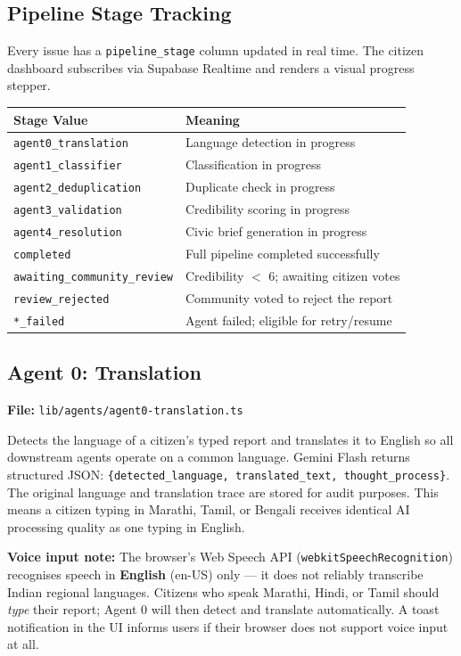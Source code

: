 \documentclass[11pt,a4paper]{article}
\newcommand{\thead}[1]{{\color{white}\bfseries\sffamily #1}}
\newcommand{\tech}[1]{\texttt{\color{cpteal}#1}}
\newcommand{\file}[1]{\texttt{\footnotesize\color{cpgray}#1}}
\begin{document}
\subsection{Pipeline Stage Tracking}

Every issue has a \tech{pipeline\_stage} column updated in real time. The citizen dashboard subscribes via Supabase Realtime and renders a visual progress stepper.

\begin{tabular}{@{} L{5.5cm} L{8.5cm} @{}}
\toprule
{}
\thead{Stage Value} & \thead{Meaning} \\
\midrule
\tech{agent0\_translation}         & Language detection in progress \\
\tech{agent1\_classifier}          & Classification in progress \\
\tech{agent2\_deduplication}       & Duplicate check in progress \\
\tech{agent3\_validation}          & Credibility scoring in progress \\
\tech{agent4\_resolution}          & Civic brief generation in progress \\
\tech{completed}                   & Full pipeline completed successfully \\
\tech{awaiting\_community\_review} & Credibility $<$ 6; awaiting citizen votes \\
\tech{review\_rejected}            & Community voted to reject the report \\
\tech{*\_failed}                   & Agent failed; eligible for retry/resume \\
\bottomrule
\end{tabular}

\subsection{Agent 0: Translation}
\label{sec:agent0}
\textbf{File:} \file{lib/agents/agent0-translation.ts}

Detects the language of a citizen's typed report and translates it to English so all downstream agents operate on a common language. Gemini Flash returns structured JSON: \tech{\{detected\_language, translated\_text, thought\_process\}}. The original language and translation trace are stored for audit purposes. This means a citizen typing in Marathi, Tamil, or Bengali receives identical AI processing quality as one typing in English.

\begin{infobox}
\textbf{Voice input note:} The browser's Web Speech API (\tech{webkitSpeechRecognition}) recognises speech in \textbf{English} (en-US) only — it does not reliably transcribe Indian regional languages. Citizens who speak Marathi, Hindi, or Tamil should \textit{type} their report; Agent 0 will then detect and translate automatically. A toast notification in the UI informs users if their browser does not support voice input at all.
\end{infobox}
\end{document}
